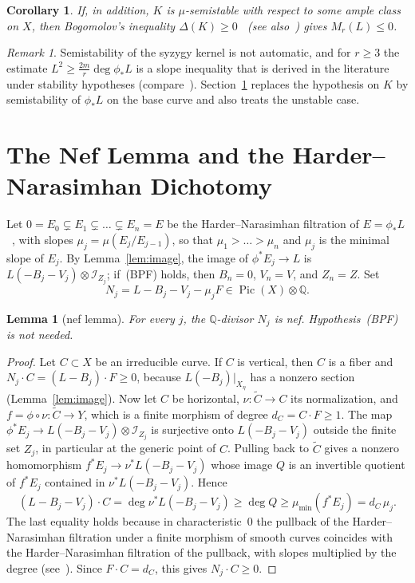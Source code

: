 \documentclass[11pt]{article}
\newtheorem{lemma}[theorem]{Lemma}
\newtheorem{corollary}[theorem]{Corollary}
\theoremstyle{definition}
\theoremstyle{remark}
\newtheorem{remark}[theorem]{Remark}
\DeclareMathOperator{\Pic}{Pic}
\newcommand{\cI}{\mathcal{I}}
\newcommand{\bpf}{\textup{(BPF)}}
\begin{document}
\begin{corollary}\label{cor:bogomolov}
If, in addition, $K$ is $\mu$-semistable with respect to some ample class on $X$,
then Bogomolov's inequality $\Delta(K)\ge 0$~\cite{Bo78} (see
also~\cite[\S3.4]{HL10}) gives $M_r(L)\le 0$.
\end{corollary}

\begin{remark}\label{rem:rankr}
Semistability of the syzygy kernel is not automatic, and for $r\ge 3$ the
estimate $L^2\ge\frac{2m}{r}\deg\phi_*L$ is a slope inequality that is derived in
the literature under stability hypotheses (compare~\cite{Xi87,CH88}).
Section~\ref{sec:nef} replaces the hypothesis on $K$ by semistability of
$\phi_*L$ on the base curve and also treats the unstable case.
\end{remark}

\section{The Nef Lemma and the Harder--Narasimhan Dichotomy}\label{sec:nef}

Let $0=E_0\subsetneq E_1\subsetneq\dots\subsetneq E_n=E$ be the
Harder--Narasimhan filtration of $E=\phi_*L$~\cite{HN75}, with slopes
$\mu_j=\mu(E_j/E_{j-1})$, so that $\mu_1>\dots>\mu_n$ and $\mu_j$ is the minimal
slope of $E_j$. By Lemma~\ref{lem:image}, the image of $\phi^*E_j\to L$ is
$L(-B_j-V_j)\otimes\cI_{Z_j}$; if~\bpf{} holds, then $B_n=0$, $V_n=V$, and
$Z_n=Z$. Set
\[
N_j=L-B_j-V_j-\mu_jF\in\Pic(X)\otimes\mathbb{Q}.
\]

\begin{lemma}[nef lemma]\label{lem:nef}
For every $j$, the $\mathbb{Q}$-divisor $N_j$ is nef. Hypothesis~\bpf{} is not
needed.
\end{lemma}

\begin{proof}
Let $C\subset X$ be an irreducible curve. If $C$ is vertical, then $C$ is a fiber
and $N_j\cdot C=(L-B_j)\cdot F\ge 0$, because $L(-B_j)|_{X_\eta}$ has a nonzero
section (Lemma~\ref{lem:image}). Now let $C$ be horizontal, $\nu\colon\widetilde C\to
C$ its normalization, and $f=\phi\circ\nu\colon\widetilde C\to Y$, which is a
finite morphism of degree $d_C=C\cdot F\ge 1$. The map $\phi^*E_j\to
L(-B_j-V_j)\otimes\cI_{Z_j}$ is surjective onto $L(-B_j-V_j)$ outside the finite
set $Z_j$, in particular at the generic point of $C$. Pulling back to
$\widetilde C$ gives a nonzero homomorphism $f^*E_j\to\nu^*L(-B_j-V_j)$ whose
image $Q$ is an invertible quotient of $f^*E_j$ contained in $\nu^*L(-B_j-V_j)$.
Hence
\[
(L-B_j-V_j)\cdot C=\deg\nu^*L(-B_j-V_j)\ge\deg Q\ge\mu_{\min}(f^*E_j)=d_C\,\mu_j .
\]
The last equality holds because in characteristic~$0$ the pullback of the
Harder--Narasimhan filtration under a finite morphism of smooth curves coincides
with the Harder--Narasimhan filtration of the pullback, with slopes multiplied by
the degree (see~\cite[\S3.2]{HL10}). Since $F\cdot C=d_C$, this gives
$N_j\cdot C\ge 0$.
\end{proof}
\end{document}
